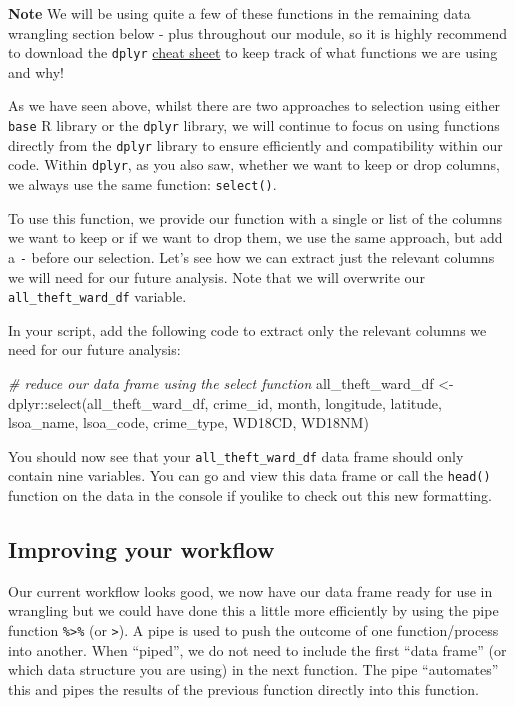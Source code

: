 \documentclass[
]{book}
\newenvironment{Shaded}{\begin{snugshade}}{\end{snugshade}}
\newcommand{\CommentTok}[1]{\textcolor[rgb]{0.56,0.35,0.01}{\textit{#1}}}
\newcommand{\FunctionTok}[1]{\textcolor[rgb]{0.00,0.00,0.00}{#1}}
\newcommand{\NormalTok}[1]{#1}
\newcommand{\OtherTok}[1]{\textcolor[rgb]{0.56,0.35,0.01}{#1}}
\newcommand{\SpecialCharTok}[1]{\textcolor[rgb]{0.00,0.00,0.00}{#1}}
\begin{document}
\textbf{Note}
We will be using quite a few of these functions in the remaining data wrangling section below - plus throughout our module, so it is highly recommend to download the \texttt{dplyr} \href{https://github.com/rstudio/cheatsheets/raw/master/data-transformation.pdf}{cheat sheet} to keep track of what functions we are using and why!

As we have seen above, whilst there are two approaches to selection using either \texttt{base} R library or the \texttt{dplyr} library, we will continue to focus on using functions directly from the \texttt{dplyr} library to ensure efficiently and compatibility within our code. Within \texttt{dplyr}, as you also saw, whether we want to keep or drop columns, we always use the same function: \texttt{select()}.

To use this function, we provide our function with a single or list of the columns we want to keep or if we want to drop them, we use the same approach, but add a \texttt{-} before our selection. Let's see how we can extract just the relevant columns we will need for our future analysis. Note that we will overwrite our \texttt{all\_theft\_ward\_df} variable.

In your script, add the following code to extract only the relevant columns we need for our future analysis:

\begin{Shaded}
\begin{Highlighting}[]
\CommentTok{\# reduce our data frame using the select function}
\NormalTok{all\_theft\_ward\_df }\OtherTok{\textless{}{-}}\NormalTok{ dplyr}\SpecialCharTok{::}\FunctionTok{select}\NormalTok{(all\_theft\_ward\_df, crime\_id, month, longitude, latitude, lsoa\_name, lsoa\_code, crime\_type, WD18CD, WD18NM)}
\end{Highlighting}
\end{Shaded}

You should now see that your \texttt{all\_theft\_ward\_df} data frame should only contain nine variables. You can go and view this data frame or call the \texttt{head()} function on the data in the console if youlike to check out this new formatting.

\hypertarget{improving-your-workflow}{%
\subsection{Improving your workflow}\label{improving-your-workflow}}

Our current workflow looks good, we now have our data frame ready for use in wrangling but we could have done this a little more efficiently by using the pipe function \texttt{\%\textgreater{}\%} (or \texttt{\textbar{}\textgreater{}}). A pipe is used to push the outcome of one function/process into another. When ``piped'', we do not need to include the first ``data frame'' (or which data structure you are using) in the next function. The pipe ``automates'' this and pipes the results of the previous function directly into this function.
\end{document}
